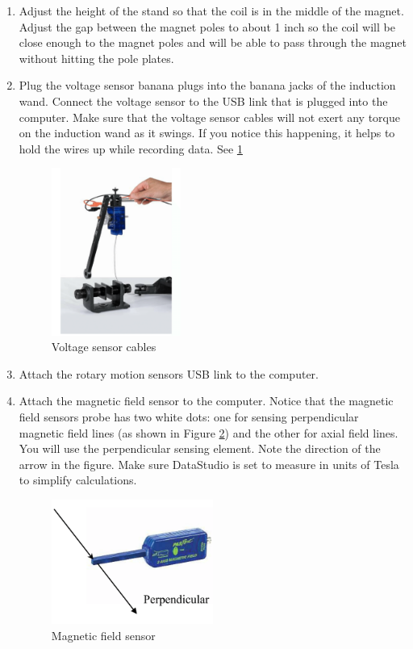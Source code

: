 \begin{enumerate}
 \item Adjust the height of the stand so that the coil is in the middle of the magnet. Adjust the gap between the magnet poles to about 1 inch so the coil will be close enough to the magnet poles and will be able to pass through the magnet without hitting the pole plates.
 \item Plug the voltage sensor banana plugs into the banana jacks of the induction wand. Connect the voltage sensor to the USB link that is plugged into the computer. Make sure that the voltage sensor cables will not exert any torque on the induction wand as it swings. If you notice this happening, it helps to hold the wires up while recording data. See \ref{fig:voltage_cables}

 \begin{figure}[h]
 \centering
 \includegraphics[width=0.4\textwidth]{./Exp4/pic/voltage_cables.png}
 \caption{Voltage sensor cables}
 \label{fig:voltage_cables}
 \end{figure}

 \item Attach the rotary motion sensors USB link to the computer.
 \item Attach the magnetic field sensor to the computer. Notice that the magnetic field sensors probe has two white dots: one for sensing perpendicular magnetic field lines (as shown in Figure \ref{fig:mag_sensor}) and the other for axial field lines. You will use the perpendicular sensing element. Note the direction of the arrow in the figure. Make sure DataStudio is set to measure in units of Tesla to simplify calculations.

 \begin{figure}[h]
 \centering
 \includegraphics[width=0.5\textwidth]{./Exp4/pic/mag_sensor.png}
 \caption{Magnetic field sensor}
 \label{fig:mag_sensor}
 \end{figure}


\end{enumerate}
